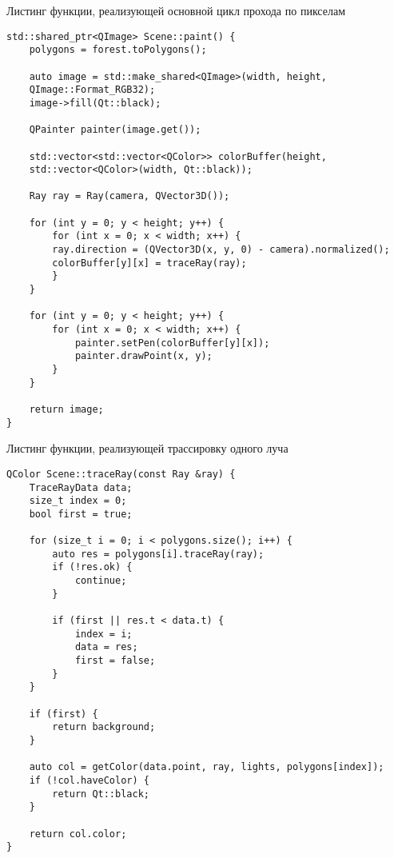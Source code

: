 \newpage
\begin{code}
\caption{Листинг функции, реализующей основной цикл прохода по пикселам}
\label{lst:1}
\begin{verbatim}
std::shared_ptr<QImage> Scene::paint() {
    polygons = forest.toPolygons();
    
    auto image = std::make_shared<QImage>(width, height, 
    QImage::Format_RGB32);
    image->fill(Qt::black);
    
    QPainter painter(image.get());
    
    std::vector<std::vector<QColor>> colorBuffer(height,
    std::vector<QColor>(width, Qt::black));
    
    Ray ray = Ray(camera, QVector3D());
    
    for (int y = 0; y < height; y++) {
        for (int x = 0; x < width; x++) {
        ray.direction = (QVector3D(x, y, 0) - camera).normalized();
        colorBuffer[y][x] = traceRay(ray);
        }
    }
    
    for (int y = 0; y < height; y++) {
        for (int x = 0; x < width; x++) {
            painter.setPen(colorBuffer[y][x]);
            painter.drawPoint(x, y);
        }
    }
    
    return image;
}
\end{verbatim}
\end{code}

\newpage
\begin{code}
\caption{Листинг функции, реализующей трассировку одного луча}
\label{lst:2}
\begin{verbatim}
QColor Scene::traceRay(const Ray &ray) {
    TraceRayData data;
    size_t index = 0;
    bool first = true;
    
    for (size_t i = 0; i < polygons.size(); i++) {
        auto res = polygons[i].traceRay(ray);
        if (!res.ok) {
            continue;
        }
        
        if (first || res.t < data.t) {
            index = i;
            data = res;
            first = false;
        }
    }
    
    if (first) {
        return background;
    }
    
    auto col = getColor(data.point, ray, lights, polygons[index]);
    if (!col.haveColor) {
        return Qt::black;
    }
    
    return col.color;
}
\end{verbatim}
\end{code}

